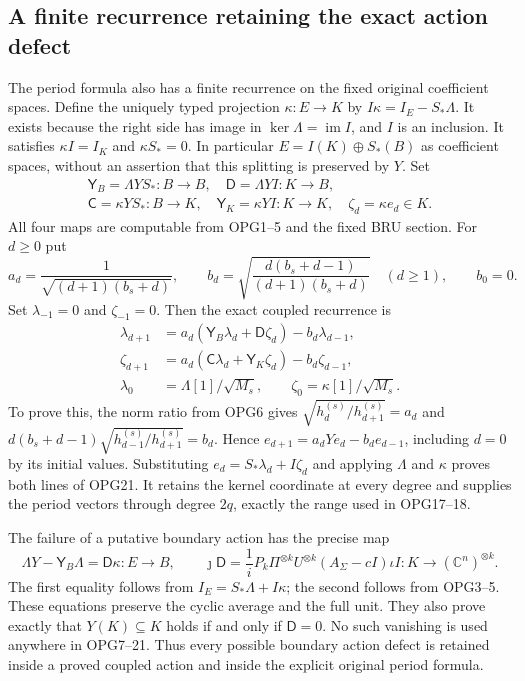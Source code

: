 \subsection{A finite recurrence retaining the exact action defect}
The period formula also has a finite recurrence on the fixed
original coefficient spaces. Define the uniquely typed projection
$\kappa:E\to K$ by
$I\kappa=I_E-S_*\Lambda$. It exists because the right side has
image in $\ker\Lambda=\operatorname{im}I$, and $I$ is an
inclusion. It satisfies $\kappa I=I_K$ and $\kappa S_*=0$.
In particular $E=I(K)\oplus S_*(B)$ as coefficient spaces, without
an assertion that this splitting is preserved by $Y$.
Set
\[
\begin{gathered}
 \mathsf Y_B=\Lambda YS_*:B\to B,\quad
 \mathsf D=\Lambda YI:K\to B,\\
 \mathsf C=\kappa YS_*:B\to K,\quad
 \mathsf Y_K=\kappa YI:K\to K,\quad
 \zeta_d=\kappa e_d\in K.
\end{gathered}\tag{OPG19}
\]
All four maps are computable from OPG1--5 and the fixed BRU
section. For $d\geq0$ put
\[
 a_d=\frac1{\sqrt{(d+1)(b_s+d)}},\qquad
 b_d=\sqrt{\frac{d(b_s+d-1)}{(d+1)(b_s+d)}}\quad(d\geq1),
 \qquad b_0=0.
 \tag{OPG20}
\]
Set $\lambda_{-1}=0$ and $\zeta_{-1}=0$. Then the exact coupled
recurrence is
\[
\boxed{\begin{aligned}
 \lambda_{d+1}&=a_d(\mathsf Y_B\lambda_d+\mathsf D\zeta_d)
                                          -b_d\lambda_{d-1},\\
 \zeta_{d+1}&=a_d(\mathsf C\lambda_d+\mathsf Y_K\zeta_d)
                                          -b_d\zeta_{d-1},\\
 \lambda_0&=\Lambda[1]/\sqrt{M_s},\qquad
 \zeta_0=\kappa[1]/\sqrt{M_s}.
\end{aligned}}\tag{OPG21}
\]
To prove this, the norm ratio from OPG6 gives
$\sqrt{h_d^{(s)}/h_{d+1}^{(s)}}=a_d$ and
$d(b_s+d-1)\sqrt{h_{d-1}^{(s)}/h_{d+1}^{(s)}}=b_d$.
Hence $e_{d+1}=a_dYe_d-b_de_{d-1}$, including $d=0$ by its
initial values. Substituting $e_d=S_*\lambda_d+I\zeta_d$ and
applying $\Lambda$ and $\kappa$ proves both lines of OPG21.
It retains the kernel coordinate at every degree and supplies
the period vectors through degree $2q$, exactly the range used
in OPG17--18.

The failure of a putative boundary action has the precise map
\[
 \Lambda Y-\mathsf Y_B\Lambda=\mathsf D\kappa:E\to B,\qquad
 \jmath\mathsf D=
 \frac1iP_k\Pi^{\otimes k}U^{\otimes k}
                   (A_\Sigma-cI)\iota I:K\to(\mathbb C^n)^{\otimes k}.
 \tag{OPG22}
\]
The first equality follows from $I_E=S_*\Lambda+I\kappa$;
the second follows from OPG3--5. These equations preserve the
cyclic average and the full unit. They also prove exactly that
$Y(K)\subseteq K$ holds if and only if $\mathsf D=0$.
No such vanishing is used anywhere in OPG7--21. Thus every
possible boundary action defect is retained inside a proved
coupled action and inside the explicit original period formula.

